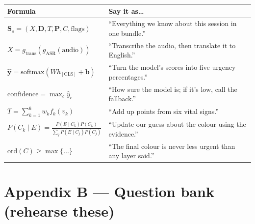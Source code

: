 \documentclass[11pt]{article}
\begin{document}
\begin{tabular}{@{}p{}p{}@{}}
\toprule
\textbf{Formula} & \textbf{Say it as\dots}\\
\midrule
$\mathbf{S}_s=(X,\mathbf{D},T,\mathbf{P},C,\text{flags})$ & ``Everything we know about this session in one bundle.''\\
$X=g_{\mathrm{trans}}(g_{\mathrm{ASR}}(\text{audio}))$ & ``Transcribe the audio, then translate it to English.''\\
$\hat{\mathbf{y}}=\mathrm{softmax}(Wh_{\mathrm{[CLS]}}+\mathbf{b})$ & ``Turn the model's scores into five urgency percentages.''\\
$\text{confidence}=\max_c\hat{y}_c$ & ``How sure the model is; if it's low, call the fallback.''\\
$T=\sum_{k=1}^6 w_k f_k(v_k)$ & ``Add up points from six vital signs.''\\
$P(C_k\mid E)=\frac{P(E\mid C_k)P(C_k)}{\sum_j P(E\mid C_j)P(C_j)}$ & ``Update our guess about the colour using the evidence.''\\
$\mathrm{ord}(C)\ge\max\{\dots\}$ & ``The final colour is never less urgent than any layer said.''\\
\bottomrule
\end{tabular}

\section{Appendix B --- Question bank (rehearse these)}
\end{document}

